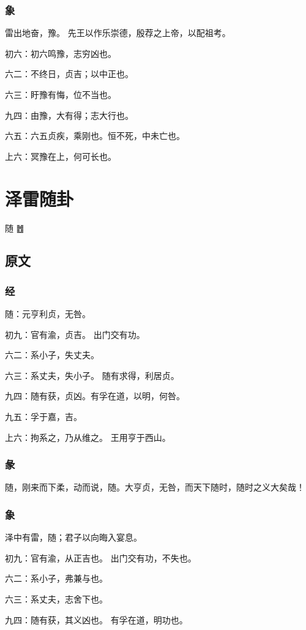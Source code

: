 \documentclass[12pt,oneside]{book}
\begin{document}
\subsection{象}
雷出地奋，豫。 先王以作乐崇德，殷荐之上帝，以配祖考。

初六：初六鸣豫，志穷凶也。

六二：不终日，贞吉；以中正也。

六三：盱豫有悔，位不当也。

九四：由豫，大有得；志大行也。

六五：六五贞疾，乘刚也。恒不死，中未亡也。

上六：冥豫在上，何可长也。


\chapter{泽雷随卦}
随 {\Large ䷐}

\section{原文}

\subsection{经}
随：元亨利贞，无咎。

初九：官有渝，贞吉。 出门交有功。

六二：系小子，失丈夫。

六三：系丈夫，失小子。 随有求得，利居贞。

九四：随有获，贞凶。有孚在道，以明，何咎。

九五：孚于嘉，吉。

上六：拘系之，乃从维之。 王用亨于西山。

\subsection{彖}
随，刚来而下柔，动而说，随。大亨贞，无咎，而天下随时，随时之义大矣哉！

\subsection{象}
泽中有雷，随；君子以向晦入宴息。

初九：官有渝，从正吉也。 出门交有功，不失也。

六二：系小子，弗兼与也。

六三：系丈夫，志舍下也。

九四：随有获，其义凶也。 有孚在道，明功也。
\end{document}
